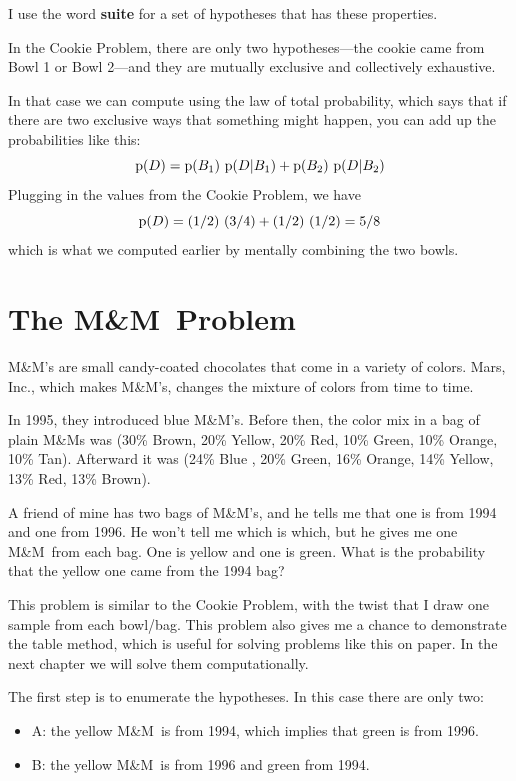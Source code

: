 \documentclass[12pt]{book}
\begin{document}
I use the word {\bf suite} for a set of hypotheses that has these
properties.

In the Cookie Problem, there are only two hypotheses---the cookie
came from Bowl 1 or Bowl 2---and they are mutually exclusive and
collectively exhaustive.

In that case we can compute  using the law of total probability,
which says that if there are two exclusive ways that something
might happen, you can add up the probabilities like this:
%
\[ \mathrm{p}(D) = \mathrm{p}(B_1)~\mathrm{p}(D|B_1) + \mathrm{p}(B_2)~\mathrm{p}(D|B_2) \]
%
Plugging in the values from the Cookie Problem, we have
%
\[ \mathrm{p}(D) = (1/2)~(3/4) + (1/2)~(1/2) = 5/8 \]
%
which is what we computed earlier by mentally combining the two
bowls.


\newcommand{\MM}{M\&M}

\section{The \MM~Problem}

\MM's are small candy-coated chocolates that come in a variety of
colors.  Mars, Inc., which makes \MM's, changes the mixture of
colors from time to time.

In 1995, they introduced blue \MM's.  Before then, the color mix in
a bag of plain M\&Ms was (30\% Brown, 20\% Yellow, 20\% Red, 10\%
Green, 10\% Orange, 10\% Tan).  Afterward it was (24\% Blue , 20\%
Green, 16\% Orange, 14\% Yellow, 13\% Red, 13\% Brown).


A friend of mine has two bags of \MM's, and he tells me
that one is from 1994 and one from 1996.  He won't tell me which is
which, but he gives me one \MM~from each bag.  One is yellow and
one is green.  What is the probability that the yellow one came
from the 1994 bag?

This problem is similar to the Cookie Problem, with the twist that I
draw one sample from each bowl/bag.  This problem also gives me a
chance to demonstrate the table method, which is useful for solving
problems like this on paper.  In the next chapter we will
solve them computationally.

The first step is to enumerate the hypotheses.  In this case there
are only two:

\begin{itemize}

\item A: the yellow \MM~is from 1994, which implies that green is
from 1996.

\item B: the yellow \MM~is from 1996 and green from 1994.

\end{itemize}
\end{document}
